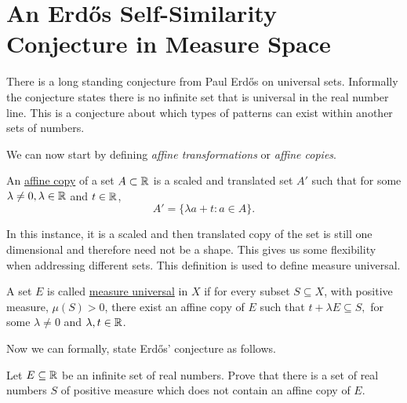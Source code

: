 \section{An Erd\H{o}s Self\hyphen{Similarity} Conjecture in Measure Space}
There is a long standing conjecture from Paul Erd\H{o}s on universal sets.  Informally the conjecture states there is no infinite set that is universal in the real number line.  This is a conjecture about which types of  patterns can exist within another sets of numbers.  


We can now start by defining \textit{affine transformations} or \textit{affine copies}.
\begin{definition}
    An \underline{affine copy} of a set $A \subset \mathbb{R}$ is a scaled and translated set $A'$ such that for some $\lambda\neq 0, \lambda \in \mathbb{R}$ and $t \in \mathbb{R}$,  $$A' = \{\lambda a + t : a \in A\}.$$
\end{definition}

In this instance, it is a scaled and then translated copy of the set is still one dimensional and therefore need not be a shape.  This gives us some flexibility when addressing different sets.  This definition is used to define measure universal. 

\begin{definition}
    A set $E$ is called \underline{measure universal} in $X$ if for every subset $S \subseteq X$, with positive measure, $\mu (S) > 0$, there exist an affine copy of $E$ such that $t+\lambda E \subseteq S,$ for some $\lambda \neq 0$ and $\lambda, t \in \mathbb{R}$.  
\end{definition}

Now we can formally, state Erd\H{o}s' conjecture as follows. 

\begin{conjecture}\label{ErdConj}
    Let $E\subseteq \mathbb{R}$ be an infinite set of real numbers.  Prove that there is a set of real numbers $S$ of positive measure which does not contain an affine copy of $E$.  
\end{conjecture}


